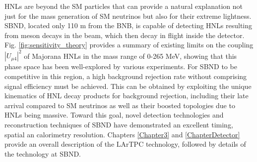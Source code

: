 HNLs are beyond the SM particles that can provide a natural explanation not just for the mass generation of SM neutrinos but also for their extreme lightness.
SBND, located only 110 m from the BNB, is capable of detecting HNLs resulting from meson decays in the beam, which then decay in flight inside the detector.
Fig. \ref{fig:sensitivity_theory} provides a summary of existing limits on the coupling $|U_{\mu4}|^2$ of Majorana HNLs in the mass range of 0-265 MeV, showing that this phase space has been well-explored by various experiments.
For SBND to be competitive in this region, a high background rejection rate without comprising signal efficiency must be achieved.
This can be obtained by exploiting the unique kinematics of HNL decay products for background rejection, including their late arrival compared to SM neutrinos as well as their boosted topologies due to HNLs being massive. 
Toward this goal, novel detection technologies and reconstruction techniques of SBND have demonstrated an excellent timing, spatial an calorimetry resolution. 
Chapters \ref{Chapter3} and \ref{ChapterDetector} provide an overall description of the LArTPC technology, followed by details of the technology at SBND.
